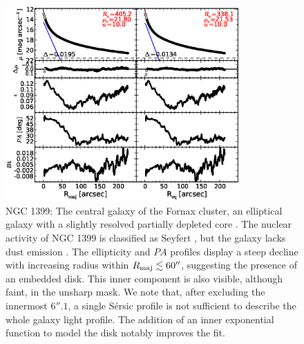 \documentclass[preprint2]{emulateapj}
\newcommand{\fitfigurewidth}{0.8\textwidth}
\begin{document}
  \begin{figure}[h]
  \begin{center}
  \includegraphics[width=\fitfigurewidth]{images/n1399_1Dfit.eps}
  \caption{NGC 1399: 
  The central galaxy of the Fornax cluster, an elliptical galaxy with a slightly resolved partially depleted core \citep{rusli2013,dullograham2014cores}. 
  The nuclear activity of NGC 1399 is classified as Seyfert \citep{veroncettyveron2006},
  but the galaxy lacks dust emission \citep{tran2001}.
  The ellipticity and $PA$ profiles display a steep decline with increasing radius within $R_{\rm maj} \lesssim 60''$,
  suggesting the presence of an embedded disk.
  This inner component is also visible, although faint, in the unsharp mask.
  We note that, after excluding the innermost $6''.1$,
  a single S\'ersic profile is not sufficient to describe the whole galaxy light profile.
  The addition of an inner exponential function to model the disk notably improves the fit.
  }
  \end{center}
  \end{figure}
\end{document}
